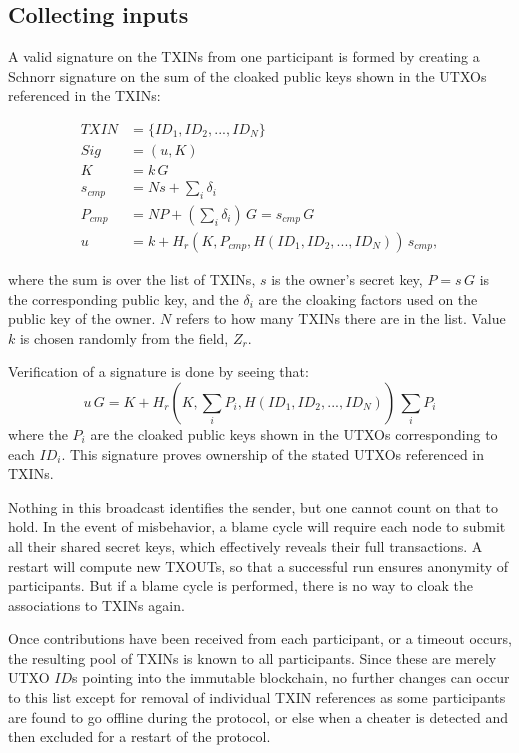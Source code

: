 \documentclass[8pt,fleqn,openany]{book}
\begin{document}
\subsection{Collecting inputs} 
A valid signature on the TXINs from one participant is formed by creating a Schnorr signature on the sum of the cloaked public keys shown in the UTXOs referenced in the TXINs:

\begin{align*}
TXIN &= \{ID_1, ID_2, ..., ID_N\}\\
Sig &= (u, K)\\
K &= k \, G \\
s_{cmp} &= N s + \sum_i{\delta_i}\\
P_{cmp} &= N P + (\sum_i{\delta_i})\, G = s_{cmp} \, G\\
u &= k + H_r(K, P_{cmp}, H(ID_1, ID_2, ..., ID_N)) \, s_{cmp},
\end{align*}

where the sum is over the list of TXINs, $s$ is the owner's secret key, $P = s \, G$ is the corresponding public key, and the $\delta_i$ are the cloaking factors used on the public key of the owner. $N$ refers to how many TXINs there are in the list. Value $k$ is chosen randomly from the field, $Z_r$. 

Verification of a signature is done by seeing that:
$$u \, G = K + H_r(K, \sum_i{P_i}, H(ID_1, ID_2, ..., ID_N)) \, \sum_i{P_i}$$
where the $P_i$ are the cloaked public keys shown in the UTXOs corresponding to each $ID_i$. This signature proves ownership of the stated UTXOs referenced in TXINs.

Nothing in this broadcast identifies the sender, but one cannot count on that to hold. In the event of misbehavior, a blame cycle will require each node to submit all their shared secret keys, which effectively reveals their full transactions. A restart will compute new TXOUTs, so that a successful run ensures anonymity of participants. But if a blame cycle is performed, there is no way to cloak the associations to TXINs again.

Once contributions have been received from each participant, or a timeout occurs, the resulting pool of TXINs is known to all participants. Since these are merely UTXO $ID$s pointing into the immutable blockchain, no further changes can occur to this list except for removal of individual TXIN references as some participants are found to go offline during the protocol, or else when a cheater is detected and then excluded for a restart of the protocol.
\end{document}

